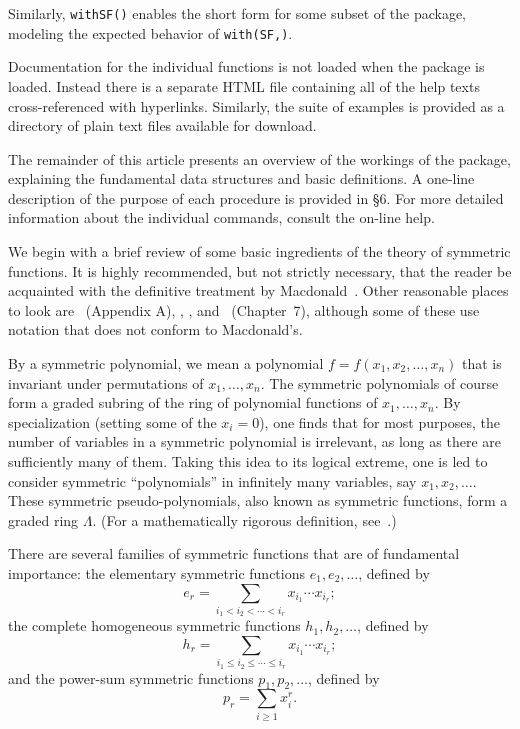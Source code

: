 
\noindent Similarly, {\tt withSF()} enables the short
form for some subset of the package, modeling the expected behavior of
{\tt with(SF,)}.

Documentation for the individual functions is not loaded when the
package is loaded. Instead there is a separate HTML file containing all
of the help texts cross-referenced with hyperlinks. Similarly, the suite
of examples is provided as a directory of plain text files available
for download.

\newpage
The remainder of this article presents an overview of the workings of the
package, explaining the fundamental data structures and basic definitions.
A one-line description of the purpose of each procedure is provided in \S6.
For more detailed information about the individual commands, consult the
on-line help.

We begin with a brief review of some basic ingredients of the theory of
symmetric functions. It is highly recommended, but not strictly necessary,
that the reader be acquainted with the definitive treatment by
Macdonald~\cite{7}. Other reasonable places to look are~\cite{1}
(Appendix A), \cite{6}, \cite{9}, and~\cite{11} (Chapter~7), although
some of these use notation that does not conform to Macdonald's.

By a symmetric polynomial, we mean a polynomial $f=f(x_1,x_2,\ldots,x_n)$
that is invariant under permutations of $x_1,\ldots,x_n$. The symmetric
polynomials of course form a graded subring of the ring of polynomial
functions of $x_1,\ldots,x_n$. By specialization (setting some of the
$x_i=0$), one finds that for most purposes, the number of variables in a
symmetric polynomial is irrelevant, as long as there are sufficiently many
of them. Taking this idea to its logical extreme, one is led to consider
symmetric ``polynomials'' in infinitely many variables,
say $x_1,x_2,\ldots$. These symmetric pseudo-polynomials,
also known as symmetric functions, form a graded ring $\Lambda$. (For a
mathematically rigorous definition, see~\cite{7}.)

There are several families of symmetric functions that are of fundamental
importance: the elementary symmetric functions $e_1,e_2,\ldots$, defined by
$$
e_r=\sum_{i_1<i_2<\cdots<i_r}x_{i_1}\!\cdots x_{i_r};
$$
the complete homogeneous symmetric functions $h_1,h_2,\ldots$, defined by
$$
h_r=\sum_{i_1\le i_2\le\cdots\le i_r}x_{i_1}\!\cdots x_{i_r};
$$
and the power-sum symmetric functions $p_1,p_2,\ldots$, defined by
$$p_r=\sum_{i\ge1} x_i^r.$$

